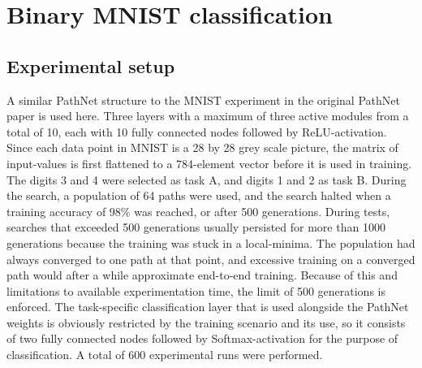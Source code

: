 

\section{Binary MNIST classification}
\label{exp1:results.binary}

\subsection{Experimental setup}
A similar PathNet structure to the MNIST experiment in the original PathNet paper is used here. 
Three layers with a maximum of three active modules from a total of 10, each with 10 fully connected nodes followed by ReLU-activation. Since each data point in MNIST is a 28 by 28 grey scale picture, the matrix of input-values is first flattened to a 784-element vector before it is used in training. The digits 3 and 4 were selected as task A, and digits 1 and 2 as task B. 
During the search, a population of 64 paths were used, and the search halted when a training accuracy of 98\% was reached, or after 500 generations. During tests, searches that exceeded 500 generations usually persisted for more than 1000 generations because the training was stuck in a local-minima. The population had always converged to one path at that point, and excessive training on a converged path would after a while approximate end-to-end training. Because of this and limitations to available experimentation time, the limit of 500 generations is enforced. The task-specific classification layer that is used alongside the PathNet weights is obviously restricted by the training scenario and its use, so it consists of two fully connected nodes followed by Softmax-activation for the purpose of classification.
A total of 600 experimental runs were performed.


